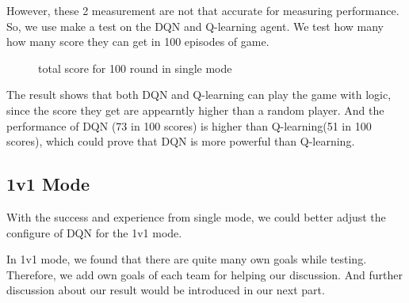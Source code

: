 \documentclass[12pt]{article}
\begin{document}
However, these 2 measurement are not that accurate for measuring performance. So, we use make a test on the DQN and Q-learning agent. We test how many how many score they can get in 100 episodes of game.

\begin{figure}[htbp]
	\centering
	\caption{total score for 100 round in single mode}
\end{figure}

 The result shows that both DQN and Q-learning can play the game with logic, since the score they get are appearntly higher than a random player. And the performance of DQN (73 in 100 scores) is higher than Q-learning(51 in 100 scores), which could prove that DQN is more powerful than Q-learning.


\subsection{1v1 Mode}

With the success and experience from single mode, we could better adjust the configure of DQN for the 1v1 mode.

In 1v1 mode, we found that there are quite many own goals while testing. Therefore, we add own goals of each team for helping our discussion. And further discussion about our result would be introduced in our next part.
\end{document}
